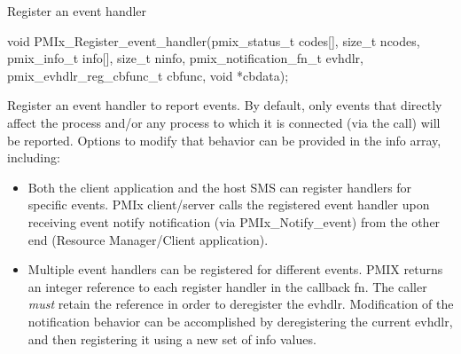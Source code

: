\summary

Register an event handler

\format

\cspecificstart
\begin{codepar}
void
PMIx_Register_event_handler(pmix_status_t codes[], size_t ncodes,
                            pmix_info_t info[], size_t ninfo,
                            pmix_notification_fn_t evhdlr,
                            pmix_evhdlr_reg_cbfunc_t cbfunc,
                            void *cbdata);
\end{codepar}
\cspecificend

\begin{arglist}
\end{arglist}


\descr

Register an event handler to report events. By default, only events that directly affect the process and/or any process to which it is connected (via the  call) will be reported. Options to modify that behavior can be provided in the info array, including:

\begin{itemize}

\item Both the client application and the host \ac{SMS} can register handlers for specific events. \ac{PMIx} client/server calls the registered event handler upon receiving event notify notification (via PMIx_Notify_event) from the other end (Resource Manager/Client application).

\item Multiple event handlers can be registered for different events. PMIX returns an integer reference to each register handler in the callback fn. The caller \textit{must} retain the reference in order to deregister the evhdlr. Modification of the notification behavior can be accomplished by deregistering the current evhdlr, and then registering it using a new set of info values.
\end{itemize}

